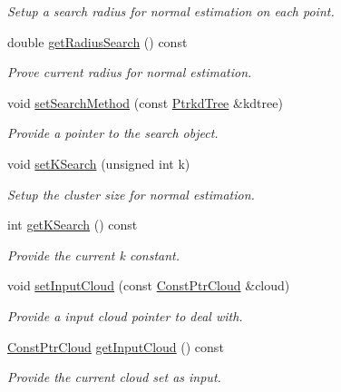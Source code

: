 \begin{DoxyCompactItemize}
\begin{DoxyCompactList}\small\item\em Setup a search radius for normal estimation on each point. \end{DoxyCompactList}\item 
double \hyperlink{classNormal2dEstimation_a2b25a3efe493da9995622279e3a21437}{get\+Radius\+Search} () const
\begin{DoxyCompactList}\small\item\em Prove current radius for normal estimation. \end{DoxyCompactList}\item 
void \hyperlink{classNormal2dEstimation_a87261649c17ea4f561da89066591a900}{set\+Search\+Method} (const \hyperlink{Normal2dEstimation_8h_a8b809d6f98757c822d529e8f675940cd}{Ptrkd\+Tree} \&kdtree)
\begin{DoxyCompactList}\small\item\em Provide a pointer to the search object. \end{DoxyCompactList}\item 
void \hyperlink{classNormal2dEstimation_a7d0bd5709580b6533a0e3f84d4a4b0e6}{set\+K\+Search} (unsigned int k)
\begin{DoxyCompactList}\small\item\em Setup the cluster size for normal estimation. \end{DoxyCompactList}\item 
int \hyperlink{classNormal2dEstimation_a19ddcf3ade201742d36e64869c344641}{get\+K\+Search} () const
\begin{DoxyCompactList}\small\item\em Provide the current k constant. \end{DoxyCompactList}\item 
void \hyperlink{classNormal2dEstimation_a8cd86c1bddf1eb5bc7cb11f0a12810f8}{set\+Input\+Cloud} (const \hyperlink{Normal2dEstimation_8h_a389a43addc496dc19a5bb0575cc60bc4}{Const\+Ptr\+Cloud} \&cloud)
\begin{DoxyCompactList}\small\item\em Provide a input cloud pointer to deal with. \end{DoxyCompactList}\item 
\hyperlink{Normal2dEstimation_8h_a389a43addc496dc19a5bb0575cc60bc4}{Const\+Ptr\+Cloud} \hyperlink{classNormal2dEstimation_a386f045fac5df50ed493d7b0aa265482}{get\+Input\+Cloud} () const
\begin{DoxyCompactList}\small\item\em Provide the current cloud set as input. \end{DoxyCompactList}\item 

\end{DoxyCompactItemize}
